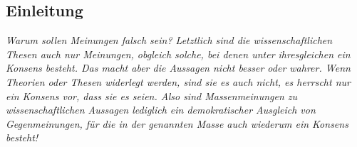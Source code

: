 \documentclass[12pt,a4paper,oneside]{article}
\begin{document}
\begin{titlepage}
\begin{flushleft}









\newpage

\section{Einleitung}
\textit{Warum sollen Meinungen falsch sein? Letztlich sind die wissenschaftlichen Thesen auch nur Meinungen, obgleich solche, bei denen unter ihresgleichen ein Konsens besteht. Das macht aber die Aussagen nicht besser oder wahrer. Wenn Theorien oder Thesen widerlegt werden, sind sie es auch nicht, es herrscht nur ein Konsens vor, dass sie es seien. Also sind Massenmeinungen zu wissenschaftlichen Aussagen lediglich ein demokratischer Ausgleich von Gegenmeinungen, für die in der genannten Masse auch wiederum ein Konsens besteht!} \cite{eemueller}


\end{flushleft}
\end{titlepage}
\end{document}
